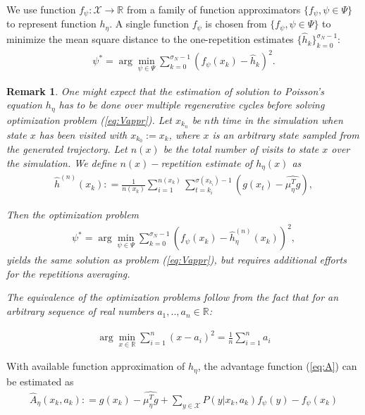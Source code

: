 \documentclass[11pt]{article}
\newcommand{\R}{\mathbb{R}}
\newcommand{\X}{\mathcal{X}}
\newtheorem{remark}{Remark}
\theoremstyle{definition}
\numberwithin{equation}{section}
\begin{document}
We use   function $f_\psi:\X\rightarrow \R$ from  a family of function approximators $\{f_\psi, \psi\in \Psi \}$ to represent function $h_{  \eta}$.    A single function $f_\psi$  is chosen from $\{f_\psi, \psi\in \Psi \}$ to minimize the mean square distance to the one-repetition estimates  $\{\hat  h_k\}_{k=0}^{\sigma_N-1}:$
\begin{align}\label{eq:Vappr}
\psi^* = \arg\min\limits_{\psi \in \Psi} \sum\limits_{k=0}^{\sigma_N-1} \left ( f_{\psi}(x_{k}) - \hat h_k   \right)^2.
\end{align}
 

 \begin{remark}
One might expect that  the estimation of solution to Poisson's equation $h_\eta$ has to be done over multiple regenerative cycles before solving optimization problem (\ref{eq:Vappr}). Let $x_{k_n}$ be $n$th time in the simulation when state $x$ has been visited with $x_{k_0} := x_k$, where $x$ is an arbitrary state sampled from the generated trajectory. Let $n(x)$ be the total number of visits to state $x$ over the simulation. We define $n(x)-$repetition estimate of $h_\eta (x)$ as 
\begin{align*} 
\hat h^{(n)} (x_k): = \frac{1}{n(x_k)} \sum\limits_{i = 1}^{n(x_k)}   \sum\limits_{t=k_i }^{\sigma(x_{k_i} )-1} \left(g(x_{t }) - \widehat {\mu_\eta^Tg}  \right) ,
\end{align*}

Then the optimization problem 
\begin{align*} 
\psi^* = \arg\min\limits_{\psi \in \Psi} \sum\limits_{k=0}^{\sigma_N-1} \left ( f_{\psi}(x_{k}) -\hat h^{(n)}_\eta(x_k)   \right)^2,
\end{align*}
yields the same solution as problem (\ref{eq:Vappr}), but requires additional efforts for the repetitions averaging.

The equivalence of the optimization problems follow from the fact that for an arbitrary sequence of real numbers $a_1, ..,a_n\in \R$:

\begin{align}\label{eq:opt} 
 \arg\min_{x\in \R} \sum\limits_{i=1}^n (x-a_i)^2 =  \frac{1}{n}\sum\limits_{i=1}^n a_i 
\end{align}
 
 \end{remark}
 
 
 With available function approximation of $h_\eta$, the advantage function (\ref{eq:A}) can be estimated as
 \begin{align}\label{eq:Aes1}
 	\hat A_{\eta}(x_k, a_k): =   g(x_k) - \widehat{\mu_\eta^T g} + \sum\limits_{y\in \X} P(y|x_k, a_k) f_{\psi} (y) -  f_{\psi}(x_k) 
 \end{align}
\end{document}
